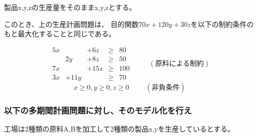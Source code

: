\documentclass[9pt]{ltjsreport}
\begin{document}
製品x,y,zの生産量をそのままx,y,zとする。

このとき、上の生産計画問題は、
目的関数$70x+120y+30z$を以下の制約条件のもと最大化することと同じである。

\begin{equation}
\begin{matrix}
        5x&   &+6z &\ge&80\\
          & 2y&+8z &\ge&50\\
        7x&   &+15z&\ge&100\\
        3x&+11y&   &\ge&70
\end{matrix}
\hspace{1cm} (\text{原料による制約})
\end{equation}
\begin{equation}
    x\ge 0,y\ge 0,z\ge 0 \hspace{1cm} (\text{非負条件} )
\end{equation}

\newpage
\subsubsection{以下の多期間計画問題に対し、そのモデル化を行え}
工場は2種類の原料A,Bを加工して2種類の製品x,yを生産しているとする。
\end{document}
